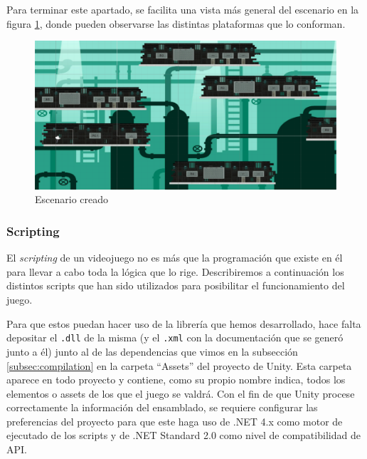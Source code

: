 Para terminar este apartado, se facilita una vista más general del escenario en la figura \ref{fig:nivel}, donde pueden observarse las distintas plataformas que lo conforman.

\begin{figure}[h]
  \centering
  \includegraphics[scale=0.175]{imagenes/nivel}
  \caption{Escenario creado}
  \label{fig:nivel}
\end{figure}

\subsubsection{Scripting}
El \textit{scripting} de un videojuego no es más que la programación que existe en él para llevar a cabo toda la lógica que lo rige. Describiremos a continuación los distintos scripts que han sido utilizados para posibilitar el funcionamiento del juego.

Para que estos puedan hacer uso de la librería que hemos desarrollado, hace falta depositar el \texttt{.dll} de la misma (y el \texttt{.xml} con la documentación que se generó junto a él) junto al de las dependencias que vimos en la subsección \ref{subsec:compilation} en la carpeta ``Assets'' del proyecto de Unity. Esta carpeta aparece en todo proyecto y contiene, como su propio nombre indica, todos los elementos o assets de los que el juego se valdrá. Con el fin de que Unity procese correctamente la información del ensamblado, se requiere configurar las preferencias del proyecto para que este haga uso de .NET 4.x como motor de ejecutado de los scripts y de .NET Standard 2.0 como nivel de compatibilidad de API.

